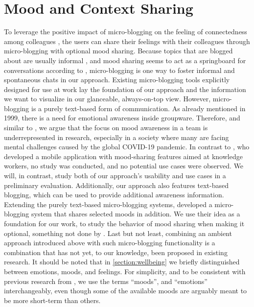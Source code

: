\section{Mood and Context Sharing}
To leverage the positive impact of micro-blogging on the feeling of connectedness among colleagues \autocite{dullemond2013fixing}, the users can share their feelings with their colleagues through micro-blogging with optional mood sharing. Because topics that are blogged about are usually informal \autocite{ehrlich2010microblogging}, and mood sharing seems to act as a springboard for conversations according to \textcite{church2010study}, micro-blogging is one way to foster informal and spontaneous chats in our approach. Existing micro-blogging tools explicitly designed for use at work lay the foundation of our approach and the information we want to visualize in our glanceable, always-on-top view. However, micro-blogging is a purely text-based form of communication. As \textcite{garcia1999emotional} already mentioned in 1999, there is a need for emotional awareness inside groupware. Therefore, and similar to \autocite{mora2011supporting}, we argue that the focus on mood awareness in a team is underrepresented in research, especially in a society where many are facing mental challenges caused by the global COVID-19 pandemic. In contrast to \textcite{saari2008mobile}, who developed a mobile application with mood-sharing features aimed at knowledge workers, no study was conducted, and no potential use cases were observed. We will, in contrast, study both of our approach's usability and use cases in a preliminary evaluation. Additionally, our approach also features text-based blogging, which can be used to provide additional awareness information. Extending the purely text-based micro-blogging systems, \textcite{dullemond2013fixing} developed a micro-blogging system that shares selected moods in addition. We use their idea as a foundation for our work, to study the behavior of mood sharing when making it optional, something not done by \textcite{dullemond2013fixing}. Last but not least, combining an ambient approach introduced above with such micro-blogging functionality is a combination that has not yet, to our knowledge, been proposed in existing research. It should be noted that in \autoref{section:wellbeing} we briefly distinguished between emotions, moods, and feelings. For simplicity, and to be consistent with previous research from \textcite{dullemond2013fixing}, we use the terms \enquote{moods}, and \enquote{emotions} interchangeably, even though some of the available moods are arguably meant to be more short-term than others.

